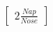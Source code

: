 \documentclass[preview]{standalone}
\begin{document}
\begin{align*}
\begin{bmatrix} 2 \frac{Nap}{Nose} \end{bmatrix}
\end{align*}
\end{document}
